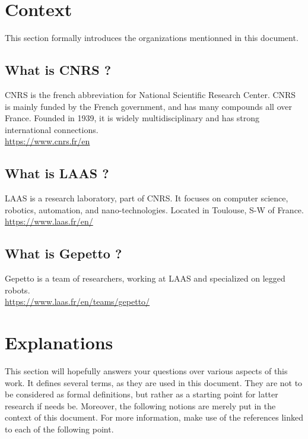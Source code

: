 \documentclass[a4paper,10pt]{article}
\begin{document}
\section{Context}
\label{context}
This section formally introduces the organizations mentionned in this document.

\subsection{What is CNRS ?}
CNRS is the french abbreviation for National Scientific Research Center. CNRS is mainly funded by the French government, and has many compounds all over France. Founded in 1939, it is widely multidisciplinary and has strong international connections.\\
\url{https://www.cnrs.fr/en}


\subsection{What is LAAS ?}
LAAS is a research laboratory, part of CNRS. It focuses on computer science, robotics, automation, and nano-technologies. Located in Toulouse, S-W of France.\\
\url{https://www.laas.fr/en/}

\subsection{What is Gepetto ?}
Gepetto is a team of researchers, working at LAAS and specialized on legged robots.\\
\url{https://www.laas.fr/en/teams/gepetto/}


\section{Explanations}
\label{explanations}
This section will hopefully answers your questions over various aspects of this work. It defines several terms, as they are used in this document. They are not to be considered as formal definitions, but rather as a starting point for latter research if needs be. Moreover, the following notions are merely put in the context of this document. For more information, make use of the references linked to each of the following point.\\
\end{document}
